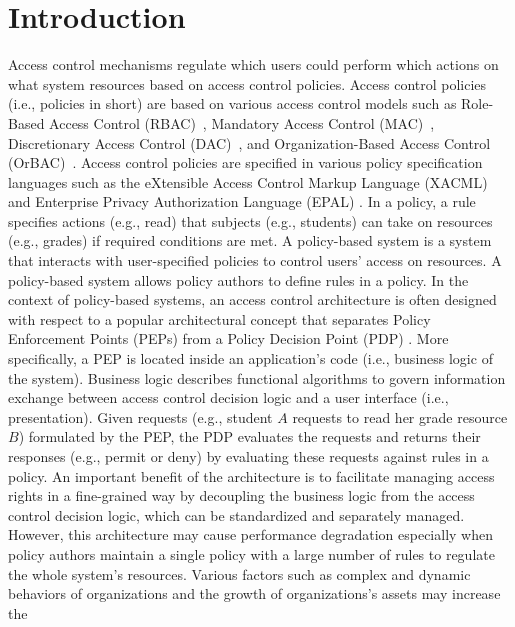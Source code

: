 \section{Introduction} \label{sec:introduction}
Access control mechanisms regulate which users
could perform which actions on what system resources based on access control policies.
Access control policies (i.e., policies in short) are based on various access control models such as Role-Based Access Control (RBAC)~\cite{ferraiolo:rbac}, Mandatory Access Control (MAC)~\cite{mac}, Discretionary Access Control (DAC)~\cite{dac}, and Organization-Based Access Control (OrBAC)~\cite{orbac}.
Access control policies are specified in various policy specification languages such
as the eXtensible Access Control Markup Language (XACML) \cite{sunxacml}
and Enterprise Privacy Authorization Language (EPAL) \cite{epal}.
In a policy, a rule specifies actions (e.g., read) that subjects (e.g., students) can take on resources (e.g., grades) if required conditions are met. 
A policy-based system is a system that interacts with user-specified policies
to control users' access on resources. A policy-based system allows policy authors to define rules in a policy.
In the context of policy-based systems, an access control architecture is often designed with respect to a popular
architectural concept that separates Policy Enforcement Points (PEPs) from a Policy Decision Point (PDP) \cite{separation}. More specifically, a PEP is located inside an 
application's code (i.e., business logic of the system).
Business logic describes functional algorithms to govern information exchange between access control decision logic and a user interface (i.e., presentation).
Given requests (e.g., student $A$ requests to read her grade resource $B$) formulated by the PEP, the PDP evaluates the requests and returns their responses (e.g., permit or deny) by evaluating these requests
against rules in a policy. An important benefit of the architecture is to facilitate managing access rights in a fine-grained way by
decoupling the business logic from the access control decision logic, which can be standardized and separately managed.
However, this architecture may cause performance degradation especially when policy authors maintain a single policy with a large number of rules to regulate the whole system's resources.
Various factors such as complex and dynamic behaviors of organizations and the growth of organizations's assets may increase the
